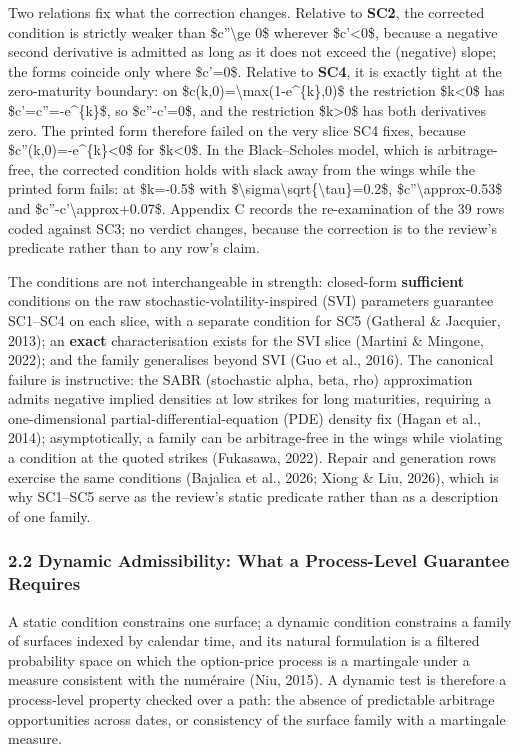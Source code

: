 \documentclass[11pt]{article}
\begin{document}
Two relations fix what the correction changes. Relative to \textbf{SC2}, the corrected condition is strictly weaker than \$c''\textbackslash{}ge 0\$ wherever \$c'<0\$, because a negative second derivative is admitted as long as it does not exceed the (negative) slope; the forms coincide only where \$c'=0\$. Relative to \textbf{SC4}, it is exactly tight at the zero-maturity boundary: on \$c(k,0)=\textbackslash{}max(1-e\textasciicircum{}\{k\},0)\$ the restriction \$k<0\$ has \$c'=c''=-e\textasciicircum{}\{k\}\$, so \$c''-c'=0\$, and the restriction \$k>0\$ has both derivatives zero. The printed form therefore failed on the very slice SC4 fixes, because \$c''(k,0)=-e\textasciicircum{}\{k\}<0\$ for \$k<0\$. In the Black–Scholes model, which is arbitrage-free, the corrected condition holds with slack away from the wings while the printed form fails: at \$k=-0.5\$ with \$\textbackslash{}sigma\textbackslash{}sqrt\{\textbackslash{}tau\}=0.2\$, \$c''\textbackslash{}approx-0.53\$ and \$c''-c'\textbackslash{}approx+0.07\$. Appendix C records the re-examination of the 39 rows coded against SC3; no verdict changes, because the correction is to the review's predicate rather than to any row's claim.

The conditions are not interchangeable in strength: closed-form \textbf{sufficient} conditions on the raw stochastic-volatility-inspired (SVI) parameters guarantee SC1–SC4 on each slice, with a separate condition for SC5 (Gatheral \& Jacquier, 2013); an \textbf{exact} characterisation exists for the SVI slice (Martini \& Mingone, 2022); and the family generalises beyond SVI (Guo et al., 2016). The canonical failure is instructive: the SABR (stochastic alpha, beta, rho) approximation admits negative implied densities at low strikes for long maturities, requiring a one-dimensional partial-differential-equation (PDE) density fix (Hagan et al., 2014); asymptotically, a family can be arbitrage-free in the wings while violating a condition at the quoted strikes (Fukasawa, 2022). Repair and generation rows exercise the same conditions (Bajalica et al., 2026; Xiong \& Liu, 2026), which is why SC1–SC5 serve as the review's static predicate rather than as a description of one family.

\subsubsection*{2.2 Dynamic Admissibility: What a Process-Level Guarantee Requires}
A static condition constrains one surface; a dynamic condition constrains a family of surfaces indexed by calendar time, and its natural formulation is a filtered probability space on which the option-price process is a martingale under a measure consistent with the numéraire (Niu, 2015). A dynamic test is therefore a process-level property checked over a path: the absence of predictable arbitrage opportunities across dates, or consistency of the surface family with a martingale measure.
\end{document}
